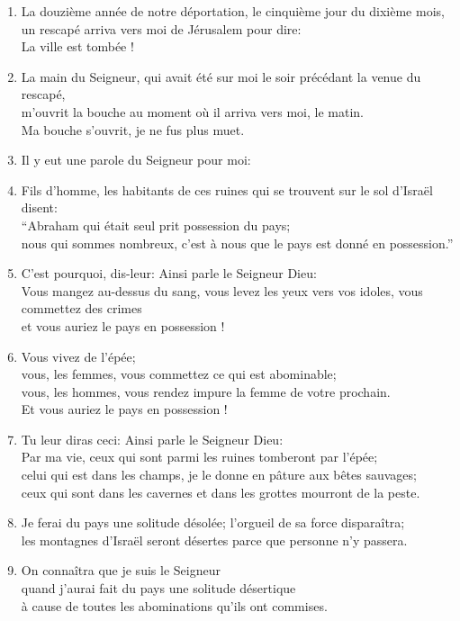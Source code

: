 \documentclass[12pt,a4paper,titlepage]{article}
\def \pslabelsep{0.2em} %
\def \psleftmargin{0em} %
\begin{document}
\begin{enumerate}[leftmargin=\psleftmargin, labelsep = \pslabelsep, label={\arabic*}, font=\color{\pscolor}\small\textsuperscript, parsep=0em, itemsep=0em, topsep=0em ]
\item La douzième année de notre déportation, le cinquième jour du dixième mois,\\ un rescapé arriva vers moi de Jérusalem pour dire:  \\ \og{}La ville est tombée !\fg{}
\item La main du Seigneur, qui avait été sur moi le soir précédant la venue du rescapé, \\ m’ouvrit la bouche au moment où il arriva vers moi, le matin. \\ Ma bouche s’ouvrit, je ne fus plus muet. \verseSpace
\item Il y eut une parole du Seigneur pour moi:
\item Fils d’homme, les habitants de ces ruines qui se trouvent sur le sol d’Israël disent: \\ “Abraham qui était seul prit possession du pays; \\ nous qui sommes nombreux, c’est à nous que le pays est donné en possession.” \verseSpace
\item C’est pourquoi, dis-leur: Ainsi parle le Seigneur Dieu: \\ Vous mangez au-dessus du sang, vous levez les yeux vers vos idoles, vous commettez des crimes \\ et vous auriez le pays en possession ! 
\item Vous vivez de l’épée; \\ vous, les femmes, vous commettez ce qui est abominable; \\ vous, les hommes, vous rendez impure la femme de votre prochain. \\ Et vous auriez le pays en possession ! \verseSpace
\item Tu leur diras ceci: Ainsi parle le Seigneur Dieu: \\ Par ma vie, ceux qui sont parmi les ruines tomberont par l’épée; \\ celui qui est dans les champs, je le donne en pâture aux bêtes sauvages; \\ ceux qui sont dans les cavernes et dans les grottes mourront de la peste.
\item Je ferai du pays une solitude désolée; l’orgueil de sa force disparaîtra; \\ les montagnes d’Israël seront désertes parce que personne n’y passera.
\item On connaîtra que je suis le Seigneur \\ quand j’aurai fait du pays une solitude désertique \\ à cause de toutes les abominations qu’ils ont commises. \verseSpace

\end{enumerate}
\end{document}
